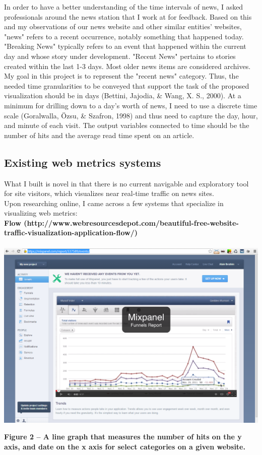 \documentclass[12pt]{article}
\begin{document}
In order to have a better understanding of the time intervals of news, I asked professionals around the news station that I work at for feedback. Based on this and my observations of our news website and other similar entities' websites, "news" refers to a recent occurrence, notably something that happened today. "Breaking News" typically refers to an event that happened within the current day and whose story under development. "Recent News" pertains to stories created within the last 1-3 days. Most older news items are considered archives. \\
 My goal in this project is to represent the "recent news" category. Thus, the needed time granularities to be conveyed that support the task of the proposed visualization should be in days (Bettini, Jajodia, \& Wang, X. S., 2000). At a minimum for drilling down to a day's worth of news, I need to use a discrete time scale (Goralwalla, \"{O}zsu, \& Szafron, 1998) and thus need to capture the day, hour, and minute of each visit. The output variables connected to time should be the number of hits and the average read time spent on an article.

\newpage

\subsection{Existing web metrics systems}
What I built is novel in that there is no current navigable and exploratory tool for site visitors, which visualizes near real-time traffic on news sites. \\
Upon researching online, I came across a few systems that specialize in visualizing web metrics: \\

\noindent\textbf{Flow (http://www.webresourcesdepot.com/beautiful-free-website-traffic-visualization-application-flow/)} \\ \\
\noindent\includegraphics[scale=0.45]{img/flow}
\begin{singlespace}
\noindent\textbf{Figure 2 -- A line graph that measures the number of hits on the y axis, and date on the x axis for select categories on a given website.} \\
\end{singlespace}
\end{document}
